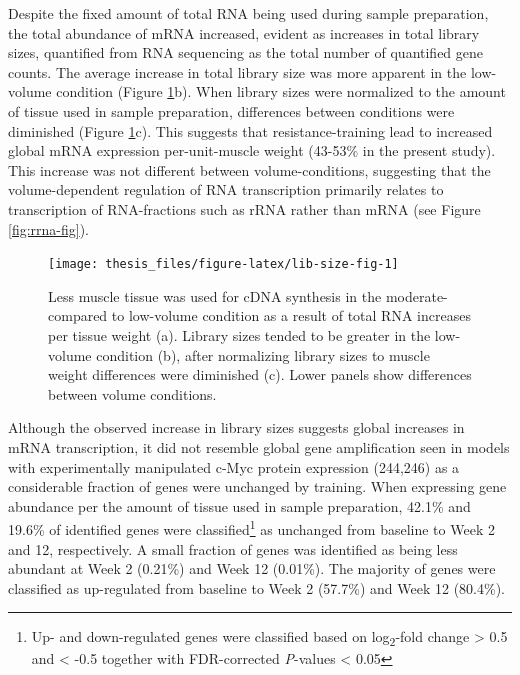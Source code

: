 \documentclass[twoside,10pt]{gihclass} %
\begin{document}
Despite the fixed amount of total RNA being used during sample preparation, the total abundance of mRNA increased, evident as increases in total library sizes, quantified from RNA sequencing as the total number of quantified gene counts. The average increase in total library size was more apparent in the low-volume condition
(Figure \ref{fig:lib-size-fig}b).
When library sizes were normalized to the amount of tissue used in sample preparation, differences between conditions were diminished
(Figure \ref{fig:lib-size-fig}c).
This suggests that resistance-training lead to increased global mRNA expression per-unit-muscle weight (43-53\% in the present study). This increase was not different between volume-conditions, suggesting that the volume-dependent regulation of RNA transcription primarily relates to transcription of RNA-fractions such as rRNA rather than mRNA (see Figure \ref{fig:rrna-fig}).
\begin{figure}

{\centering \texttt{[image: thesis\_files/figure-latex/lib-size-fig-1]} 

}

\caption[Muscle weight in RNA-sequencing library preparation]{Less muscle tissue was used for cDNA synthesis in the moderate- compared to low-volume condition as a result of total RNA increases per tissue weight (a). Library sizes tended to be greater in the low-volume condition (b), after normalizing library sizes to muscle weight differences were diminished (c). Lower panels show differences between volume conditions.}\label{fig:lib-size-fig}
\end{figure}
Although the observed increase in library sizes suggests global increases in mRNA transcription, it did not resemble global gene amplification seen in models with experimentally manipulated c-Myc protein expression
(244,246)
as a considerable fraction of genes were unchanged by training.
When expressing gene abundance per the amount of tissue used in sample preparation, 42.1\% and 19.6\% of identified genes were classified\footnote{Up- and down-regulated genes were classified based on log\textsubscript{2}-fold change \textgreater{} 0.5 and \textless{} -0.5 together with FDR-corrected \emph{P}-values \textless{} 0.05} as unchanged from baseline to Week 2 and 12, respectively. A small fraction of genes was identified as being less abundant at Week 2 (0.21\%) and Week 12 (0.01\%). The majority of genes were classified as up-regulated from baseline to Week 2 (57.7\%) and Week 12 (80.4\%).
\end{document}
